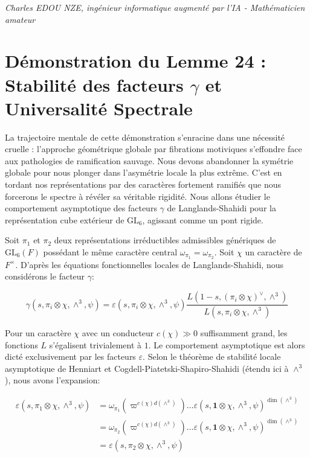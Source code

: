 \documentclass[
]{article}
\begin{document}
\vspace{1cm}
\begin{flushright}
\textit{Charles EDOU NZE, ingénieur informatique augmenté par l'IA - Mathématicien amateur}
\end{flushright}


\section{Démonstration du Lemme 24 : Stabilité des facteurs $\gamma$ et Universalité Spectrale}

La trajectoire mentale de cette démonstration s'enracine dans une nécessité cruelle : l'approche géométrique globale par fibrations motiviques s'effondre face aux pathologies de ramification sauvage. Nous devons abandonner la symétrie globale pour nous plonger dans l'asymétrie locale la plus extrême. C'est en tordant nos représentations par des caractères fortement ramifiés que nous forcerons le spectre à révéler sa véritable rigidité. Nous allons étudier le comportement asymptotique des facteurs $\gamma$ de Langlands-Shahidi pour la représentation cube extérieur de $\mathrm{GL}_6$, agissant comme un pont rigide.

Soit $\pi_1$ et $\pi_2$ deux représentations irréductibles admissibles génériques de $\mathrm{GL}_6(F)$ possédant le même caractère central $\omega_{\pi_1} = \omega_{\pi_2}$. Soit $\chi$ un caractère de $F^\times$. D'après les équations fonctionnelles locales de Langlands-Shahidi, nous considérons le facteur $\gamma$:

\begin{equation*}
\gamma(s, \pi_i \otimes \chi, \wedge^3, \psi) = \varepsilon(s, \pi_i \otimes \chi, \wedge^3, \psi) \frac{L(1-s, (\pi_i \otimes \chi)^\vee, \wedge^3)}{L(s, \pi_i \otimes \chi, \wedge^3)}
\end{equation*}

Pour un caractère $\chi$ avec un conducteur $c(\chi) \gg 0$ suffisamment grand, les fonctions $L$ s'égalisent trivialement à $1$. Le comportement asymptotique est alors dicté exclusivement par les facteurs $\varepsilon$. Selon le théorème de stabilité locale asymptotique de Henniart et Cogdell-Piatetski-Shapiro-Shahidi (étendu ici à $\wedge^3$), nous avons l'expansion:

\begin{align*}
\varepsilon(s, \pi_1 \otimes \chi, \wedge^3, \psi) &= \omega_{\pi_1}(\varpi^{c(\chi) d(\wedge^3)}) \dots \varepsilon(s, \mathbf{1} \otimes \chi, \wedge^3, \psi)^{\operatorname{dim}(\wedge^3)} \\
&= \omega_{\pi_2}(\varpi^{c(\chi) d(\wedge^3)}) \dots \varepsilon(s, \mathbf{1} \otimes \chi, \wedge^3, \psi)^{\operatorname{dim}(\wedge^3)} \\
&= \varepsilon(s, \pi_2 \otimes \chi, \wedge^3, \psi)
\end{align*}
\end{document}
